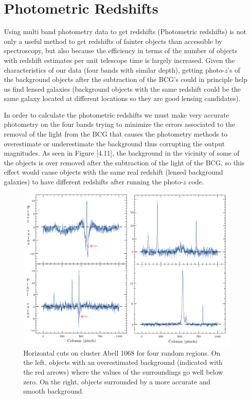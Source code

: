 \section{Photometric Redshifts}

Using multi band photometry data to get redshifts (Photometric redshifts) is not only a useful method to get redshifts of fainter objects than accessible by spectroscopy, but also because the efficiency in terms of the number of objects with redshift estimates per unit telescope time is largely increased. Given the characteristics of our data (four bands with similar depth), getting photo-$z$'s of the background objects after the subtraction of the BCG's could in principle help us find lensed galaxies (background objects with the same redshift could be the same galaxy located at different locations so they are good lensing candidates).

In order to calculate the photometric redshifts we must make very accurate photometry on the four bands trying to minimize the errors associated to the removal of the light from the BCG that causes the photometry methods to overestimate or underestimate the background thus corrupting the output magnitudes. As seen in Figure [4.11], the background in the vicinity of some of the objects is over removed after the subtraction of the light of the BCG, so this effect would cause objects with the same real redshift (lensed background galaxies) to have different redshifts after running the photo-$z$ code.

\begin{figure}[H]
\centering
\includegraphics[width=15cm]{images/horizontal_cuts.png}
\caption[Horizontal cuts to show overestimated background on Abell 1068]{Horizontal cuts on cluster Abell 1068 for four random regions. On the left, objects with an overestimated background (indicated with the red arrows) where the values of the surroundings go well below zero. On the right, objects surrounded by a more accurate and smooth background.}
\end{figure}

